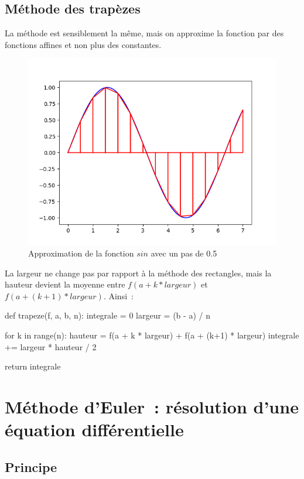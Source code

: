 	\subsection{Méthode des trapèzes}
		
		La méthode est sensiblement la même, mais on approxime la fonction par des fonctions affines et non plus des constantes.
		
		\begin{figure}[htp]
			\centering
			\includegraphics[scale=0.75]{images/Figure_4.png}
			\caption{Approximation de la fonction $sin$ avec un pas de 0.5}
		\end{figure}
		
		La largeur ne change pas par rapport à la méthode des rectangles, mais la hauteur devient la moyenne entre $f(a + k * largeur)$ et $f(a + (k + 1) * largeur)$. Ainsi~:
		
		\begin{pythoncode}
			def trapeze(f, a, b, n):
				integrale = 0
				largeur = (b - a) / n
				
				for k in range(n):
					hauteur = f(a + k * largeur) + f(a + (k+1) * largeur)
					integrale += largeur * hauteur / 2
				
				return integrale
		\end{pythoncode}

\section{Méthode d'Euler~: résolution d'une équation différentielle}
	
	\subsection{Principe}
		
